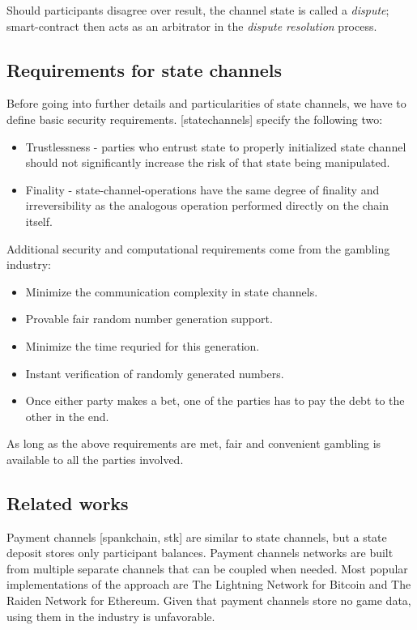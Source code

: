 	Should participants disagree over result, the channel state is called a \textit {dispute}; smart-contract then acts as an arbitrator in the \textit {dispute resolution} process.

		\subsection {Requirements for state channels}
	Before going into further details and particularities of state channels, we have to define basic security requirements. [statechannels] specify the following two:
	\begin{itemize}
		\item Trustlessness - parties who entrust state to properly initialized state channel should not significantly increase the risk of that state being manipulated. 
		\item Finality - state-channel-operations have the same degree of finality and irreversibility as the analogous operation performed directly on the chain itself.
	\end{itemize}
	Additional security and computational requirements come from the gambling industry:
	\begin{itemize}
		\item Minimize the communication complexity in state channels.
		\item Provable fair random number generation support.
		\item Minimize the time requried for this generation.
		\item Instant verification of randomly generated numbers.
		\item Once either party makes a bet, one of the parties has to pay the debt to the other in the end. 
	\end{itemize}

	As long as the above requirements are met, fair and convenient gambling is available to all the parties involved.

		\subsection {Related works} 
	Payment channels [spankchain, stk] are similar to state channels, but a state deposit stores only participant balances. Payment channels networks are built from multiple separate channels that can be coupled when needed. Most popular implementations of the approach are The Lightning Network for Bitcoin and The Raiden Network for Ethereum. Given that payment channels store no game data, using them in the industry is unfavorable. 

